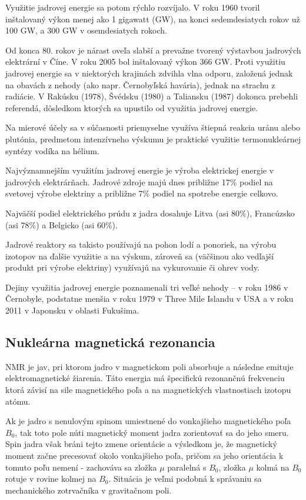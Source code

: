 \documentclass[../../main.tex]{subfiles}
\begin{document}
Využitie jadrovej energie sa potom rýchlo rozvíjalo. V roku 1960 tvoril inštalovaný výkon menej ako 1 gigawatt (GW), na konci sedemdesiatych rokov už 100 GW, a 300 GW v osemdesiatych rokoch.

Od konca 80. rokov je nárast oveľa slabší a prevažne tvorený výstavbou jadrových elektrární v Číne. V roku 2005 bol inštalovaný výkon 366 GW. Proti využitiu jadrovej energie sa v niektorých krajinách zdvihla vlna odporu, založená jednak na obavách z nehody (ako napr. Černobyľská havária), jednak na strachu z radiácie. V Rakúsku (1978), Švédsku (1980) a Taliansku (1987) dokonca prebehli referendá, dôsledkom ktorých sa upustilo od využitia jadrovej energie.

Na mierové účely sa v súčasnosti priemyselne využíva štiepná reakcia uránu alebo plutónia, predmetom intenzívneho výskumu je praktické využitie termonukleárnej syntézy vodíka na hélium.

Najvýznamnejším využitím jadrovej energie je výroba elektrickej energie v jadrových elektrárňach. Jadrové zdroje majú dnes približne 17$\%$ podiel na svetovej výrobe elektriny a približne 7$\%$ podiel na spotrebe energie celkovo.

Najväčší podiel elektrického prúdu z jadra dosahuje Litva (asi 80$\%$), Francúzsko (asi 78$\%$) a Belgicko (asi 60$\%$).

Jadrové reaktory sa takisto používajú na pohon lodí a ponoriek, na výrobu izotopov na ďalšie využitie a na výskum, zároveň sa (väčšinou ako vedľajší produkt pri výrobe elektriny) využívajú na vykurovanie či ohrev vody.

Dejiny využitia jadrovej energie poznamenali tri veľké nehody – v roku 1986 v Černobyle, podstatne menšia v roku 1979 v Three Mile Islandu v USA a v roku 2011 v Japonsku v oblasti Fukušima.

\subsection{Nukleárna magnetická rezonancia}

NMR je jav, pri ktorom jadro v magnetickom poli absorbuje a následne emituje elektromagnetické žiarenia. Táto energia má špecifickú rezonančnú frekvenciu ktorá závisí na sile magnetického poľa a na magnetických vlastnostiach izotopu atómu. 

Ak je jadro s nenulovým spinom umiestnené do vonkajšieho magnetického poľa $B_0$, tak toto pole núti magnetický moment jadra zorientovať sa do jeho smeru. Spin jadra však bráni tejto zmene orientácie a výsledkom je, že magnetický moment začne precesovať okolo vonkajšieho poľa, pričom sa jeho orientácia k tomuto poľu nemení - zachováva sa zložka $\mu$ paralelná s $B_0$, zložka $\mu$ kolmá na $B_0$ rotuje v rovine kolmej na $B_0$. Situácia je veľmi podobná k správaniu sa mechanického zotrvačníka v gravitačnom poli.
\end{document}

